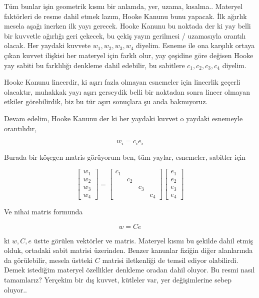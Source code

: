 \documentclass[12pt,fleqn]{article}\usepackage{../../common}
\begin{document}
Tüm bunlar işin geometrik kısmı bir anlamda, yer, uzama, kısalma.. Materyel
faktörleri de resme dahil etmek lazım, Hooke Kanunu bunu yapacak. İlk ağırlık
mesela aşağı inerken ilk yayı gerecek. Hooke Kanunu bu noktada der ki yay belli
bir kuvvetle ağırlığı geri çekecek, bu çekiş yayın gerilmesi / uzamasıyla
orantılı olacak. Her yaydaki kuvvete $w_1,w_2,w_3,w_4$ diyelim. Esneme ile ona
karşılık ortaya çıkan kuvvet ilişkisi her materyel için farklı olur, yay
çeşidine göre değisen Hooke yay sabiti bu farklılığı denkleme dahil edebilir, bu
sabitlere $c_1,c_2,c_3,c_4$ diyelim.

Hooke Kanunu lineerdir, ki aşırı fazla olmayan esnemeler için lineerlik geçerli
olacaktır, muhakkak yayı aşırı gerseydik belli bir noktadan sonra lineer olmayan
etkiler görebilirdik, biz bu tür aşırı sonuçlara şu anda bakmıyoruz.

Devam edelim, Hooke Kanunu der ki her yaydaki kuvvet o yaydaki esnemeyle orantılıdır,

$$
w_i = c_i e_i 
$$

Burada bir köşegen matris görüyorum ben, tüm yaylar, esnemeler, sabitler için

$$
\left[\begin{array}{c}
w_1 \\ w_2 \\ w_3 \\ w_4
\end{array}\right] =
\left[\begin{array}{cccc}
c_1 & & & \\  & c_2 & & \\  & & c_3 & \\ & & & c_4
\end{array}\right]
\left[\begin{array}{c}
e_1 \\ e_2 \\ e_3 \\ e_4
\end{array}\right] 
$$

Ve nihai matris formunda

$$
w = C e
$$

ki $w,C,e$ üstte görülen vektörler ve matris. Materyel kısmı bu şekilde dahil
etmiş olduk, ortadaki sabit matrisi üzerinden. Benzer kanunlar fiziğin diğer
alanlarında da görülebilir, mesela üstteki $C$ matrisi iletkenliği de temsil
ediyor olabilirdi. Demek istediğim materyel özellikler denkleme oradan dahil
oluyor. Bu resmi nasıl tamamlarız? Yerçekim bir dış kuvvet, kütleler var, yer
değişimlerine sebep oluyor..
\end{document}
